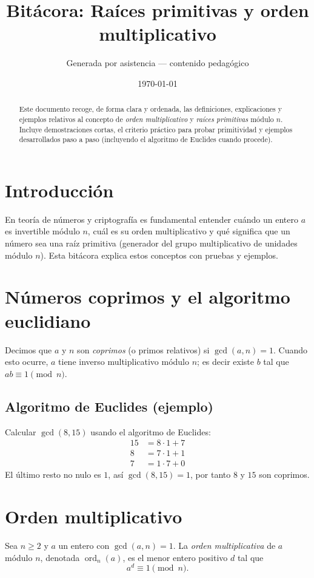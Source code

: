 \documentclass[12pt]{article}
\title{Bitácora: Raíces primitivas y orden multiplicativo}
\author{Generada por asistencia — contenido pedagógico}
\date{\today}
\begin{document}
\maketitle
\begin{abstract}
Este documento recoge, de forma clara y ordenada, las definiciones, explicaciones y ejemplos relativos al concepto de \emph{orden multiplicativo} y \emph{raíces primitivas} módulo $n$. Incluye demostraciones cortas, el criterio práctico para probar primitividad y ejemplos desarrollados paso a paso (incluyendo el algoritmo de Euclides cuando procede).
\end{abstract}

\section{Introducción}
En teoría de números y criptografía es fundamental entender cuándo un entero $a$ es invertible módulo $n$, cuál es su orden multiplicativo y qué significa que un número sea una raíz primitiva (generador del grupo multiplicativo de unidades módulo $n$). Esta bitácora explica estos conceptos con pruebas y ejemplos.

\section{Números coprimos y el algoritmo euclidiano}
\begin{definition}
Decimos que $a$ y $n$ son \emph{coprimos} (o primos relativos) si $\gcd(a,n)=1$. Cuando esto ocurre, $a$ tiene inverso multiplicativo módulo $n$; es decir existe $b$ tal que $ab\equiv1\pmod n$.
\end{definition}

\subsection{Algoritmo de Euclides (ejemplo)}
Calcular $\gcd(8,15)$ usando el algoritmo de Euclides:
\[
\begin{aligned}
15 &= 8\cdot 1 + 7\\
8  &= 7\cdot 1 + 1\\
7  &= 1\cdot 7 + 0
\end{aligned}
\]
El último resto no nulo es $1$, así $\gcd(8,15)=1$, por tanto $8$ y $15$ son coprimos.

\section{Orden multiplicativo}
\begin{definition}
Sea $n\ge 2$ y $a$ un entero con $\gcd(a,n)=1$. La \emph{orden multiplicativa} de $a$ módulo $n$, denotada $\operatorname{ord}_n(a)$, es el menor entero positivo $d$ tal que
\[a^d\equiv1\pmod n.\]
\end{definition}
\end{document}
